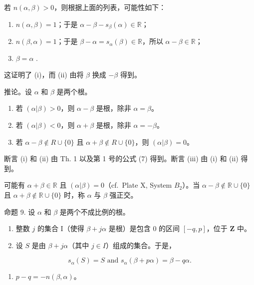 若 \(n(\alpha, \beta) > 0\)，则根据上面的列表，可能性如下：

\begin{enumerate}
\def\labelenumi{\arabic{enumi})}
\item
  \(n(\alpha, \beta) = 1\)；于是 \(\alpha - \beta - s_{\beta}(\alpha) \in \mathbb{R}\)；
\item
  \(n(\beta, \alpha) = 1\)；于是 \(\beta - \alpha = s_{\alpha}(\beta) \in \mathbb{R}\)，所以 \(\alpha - \beta \in \mathbb{R}\)；
\item
  \(\beta = \alpha\) .
\end{enumerate}

这证明了 (i)，而 (ii) 由将 \(\beta\) 换成 \(-\beta\) 得到。

推论。设 \(\alpha\) 和 \(\beta\) 是两个根。

\begin{enumerate}
\def\labelenumi{(\roman{enumi})}
\item
  若 \((\alpha |\beta) > 0\)，则 \(\alpha - \beta\) 是根，除非 \(\alpha = \beta\)。
\item
  若 \((\alpha |\beta) < 0\)，则 \(\alpha + \beta\) 是根，除非 \(\alpha = -\beta\)。
\item
  若 \(\alpha - \beta \notin R \cup \{0\}\) 且 \(\alpha + \beta \notin R \cup \{0\}\)，则 \((\alpha | \beta) = 0\)。
\end{enumerate}

断言 (i) 和 (ii) 由 Th. 1 以及第 1 号的公式 (7) 得到。断言 (iii) 由 (i) 和 (ii) 得到。

可能有 \(\alpha + \beta \in \mathbb{R}\) 且 \((\alpha|\beta) = 0\)（cf.~Plate X, System \(B_{2}\)）。当 \(\alpha - \beta \notin \mathbb{R} \cup \{0\}\) 且 \(\alpha + \beta \notin \mathbb{R} \cup \{0\}\) 时，称 \(\alpha\) 与 \(\beta\) 强正交。

命题 9. 设 \(\alpha\) 和 \(\beta\) 是两个不成比例的根。

\begin{enumerate}
\def\labelenumi{(\roman{enumi})}
\item
  整数 \(j\) 的集合 I（使得 \(\beta + j\alpha\) 是根）是包含 0 的区间 \([-q, p]\)，位于 \(\mathbf{Z}\) 中。
\item
  设 \(S\) 是由 \(\beta + j\alpha\)（其中 \(j \in I\)）组成的集合。于是，
\end{enumerate}

\[
s _ {\alpha} (S) = S \text { and } s _ {\alpha} (\beta + p \alpha) = \beta - q \alpha .
\]

\begin{enumerate}
\def\labelenumi{(\roman{enumi})}
\setcounter{enumi}{2}
\tightlist
\item
  \(p - q = -n(\beta, \alpha)\)。
\end{enumerate}

